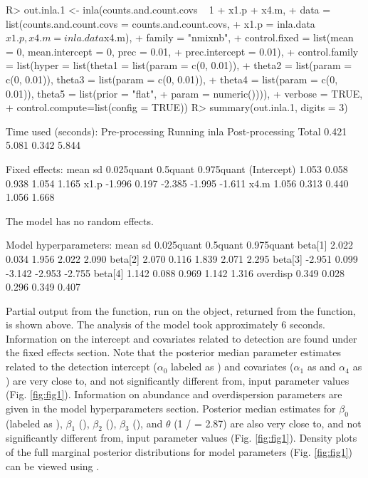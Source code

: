 \documentclass[codesnippet]{jss}
\begin{document}
\begin{CodeInput}
R> out.inla.1 <- inla(counts.and.count.covs ~ 1 + x1.p + x4.m,
+    data = list(counts.and.count.covs = counts.and.count.covs,
+      x1.p = inla.data$x1.p, x4.m = inla.data$x4.m),
+    family = "nmixnb",
+    control.fixed = list(mean = 0, mean.intercept = 0, prec = 0.01,
+      prec.intercept = 0.01),
+    control.family = list(hyper = list(theta1 = list(param = c(0, 0.01)),
+      theta2 = list(param = c(0, 0.01)), theta3 = list(param = c(0, 0.01)),
+      theta4 = list(param = c(0, 0.01)), theta5 = list(prior = "flat",
+      param = numeric()))),
+    verbose = TRUE,
+    control.compute=list(config = TRUE))
R> summary(out.inla.1, digits = 3)
\end{CodeInput}
\begin{CodeOutput}
Time used (seconds):
Pre-processing    Running inla    Post-processing    Total 
0.421             5.081           0.342              5.844 

Fixed effects:
              mean     sd  0.025quant 0.5quant  0.975quant
(Intercept)  1.053  0.058       0.938     1.054      1.165
x1.p        -1.996  0.197      -2.385    -1.995     -1.611
x4.m         1.056  0.313       0.440     1.056      1.668

The model has no random effects.

Model hyperparameters:
             mean      sd  0.025quant  0.5quant 0.975quant
beta[1]     2.022   0.034       1.956     2.022      2.090
beta[2]     2.070   0.116       1.839     2.071      2.295
beta[3]    -2.951   0.099      -3.142    -2.953     -2.755
beta[4]     1.142   0.088       0.969     1.142      1.316
overdisp    0.349   0.028       0.296     0.349      0.407
\end{CodeOutput}

Partial output from the  function, run on the  object, returned from the  function, is shown above. The analysis of the model took approximately 6 seconds.  Information on the intercept and covariates related to detection are found under the fixed effects section.  Note that the posterior median parameter estimates related to the detection intercept ($\alpha_0$ labeled as ) and covariates ($\alpha_1$ as  and $\alpha_4$ as ) are very close to, and not significantly different from, input parameter values (Fig. \ref{fig:fig1}). Information on abundance and overdispersion parameters are given in the model hyperparameters section. Posterior median estimates for $\beta_0$ (labeled as ), $\beta_1$ (), $\beta_2$ (), $\beta_3$ (), and $\theta$ (1 /  = 2.87) are also very close to, and not significantly different from, input parameter values (Fig. \ref{fig:fig1}). Density plots of the full marginal posterior distributions for model parameters (Fig. \ref{fig:fig1}) can be viewed using .
\end{document}
